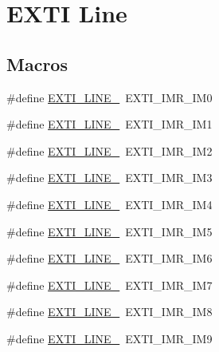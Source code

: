 \hypertarget{group___e_x_t_i___line}{}\section{E\+X\+TI Line}
\label{group___e_x_t_i___line}
\subsection*{Macros}
\begin{DoxyCompactItemize}
\item 
\#define \hyperlink{group___e_x_t_i___line_gac1a9cd58d76e9f497abecc832e3294c8}{E\+X\+T\+I\+\_\+\+L\+I\+N\+E\+\_}~E\+X\+T\+I\+\_\+\+I\+M\+R\+\_\+\+I\+M0
\item 
\#define \hyperlink{group___e_x_t_i___line_gaf64b8deca0cf44b4c58d2b4d0fcd2177}{E\+X\+T\+I\+\_\+\+L\+I\+N\+E\+\_}~E\+X\+T\+I\+\_\+\+I\+M\+R\+\_\+\+I\+M1
\item 
\#define \hyperlink{group___e_x_t_i___line_gaec48b88f5279b95962682300c0650840}{E\+X\+T\+I\+\_\+\+L\+I\+N\+E\+\_}~E\+X\+T\+I\+\_\+\+I\+M\+R\+\_\+\+I\+M2
\item 
\#define \hyperlink{group___e_x_t_i___line_ga7e223d61dcb2b538040824c0b491d68c}{E\+X\+T\+I\+\_\+\+L\+I\+N\+E\+\_}~E\+X\+T\+I\+\_\+\+I\+M\+R\+\_\+\+I\+M3
\item 
\#define \hyperlink{group___e_x_t_i___line_gaf8e1e94adf29806583e68170c1dad7dd}{E\+X\+T\+I\+\_\+\+L\+I\+N\+E\+\_}~E\+X\+T\+I\+\_\+\+I\+M\+R\+\_\+\+I\+M4
\item 
\#define \hyperlink{group___e_x_t_i___line_gab7859f0b07e671f71be61d7d301eb909}{E\+X\+T\+I\+\_\+\+L\+I\+N\+E\+\_}~E\+X\+T\+I\+\_\+\+I\+M\+R\+\_\+\+I\+M5
\item 
\#define \hyperlink{group___e_x_t_i___line_gaebcb8302f9aae1d54c7aada7ade230c0}{E\+X\+T\+I\+\_\+\+L\+I\+N\+E\+\_}~E\+X\+T\+I\+\_\+\+I\+M\+R\+\_\+\+I\+M6
\item 
\#define \hyperlink{group___e_x_t_i___line_ga32a33e800bf0f754d0337ab30abde810}{E\+X\+T\+I\+\_\+\+L\+I\+N\+E\+\_}~E\+X\+T\+I\+\_\+\+I\+M\+R\+\_\+\+I\+M7
\item 
\#define \hyperlink{group___e_x_t_i___line_ga0bb9322e3cfbe3a256f9e479ba3e5664}{E\+X\+T\+I\+\_\+\+L\+I\+N\+E\+\_}~E\+X\+T\+I\+\_\+\+I\+M\+R\+\_\+\+I\+M8
\item 
\#define \hyperlink{group___e_x_t_i___line_ga714a1411d5dc8bcf6b6efe69396fbccf}{E\+X\+T\+I\+\_\+\+L\+I\+N\+E\+\_}~E\+X\+T\+I\+\_\+\+I\+M\+R\+\_\+\+I\+M9
\item 

\end{DoxyCompactItemize}
